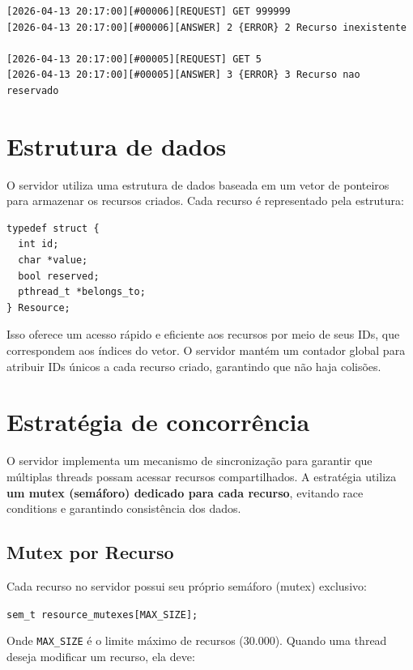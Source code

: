 \documentclass{article}
\begin{document}
\begin{Verbatim}[tabsize=4]
[2026-04-13 20:17:00][#00006][REQUEST] GET 999999
[2026-04-13 20:17:00][#00006][ANSWER] 2 {ERROR} 2 Recurso inexistente

[2026-04-13 20:17:00][#00005][REQUEST] GET 5
[2026-04-13 20:17:00][#00005][ANSWER] 3 {ERROR} 3 Recurso nao reservado

\end{Verbatim}

\section{Estrutura de dados}
O servidor utiliza uma estrutura de dados baseada em um vetor de ponteiros para armazenar os recursos criados. Cada recurso é representado pela estrutura:

\begin{verbatim}
typedef struct {
  int id;
  char *value;
  bool reserved;
  pthread_t *belongs_to;
} Resource;
\end{verbatim}

Isso oferece um acesso rápido e eficiente aos recursos por meio de seus IDs, que correspondem aos índices do vetor. O servidor mantém um contador global para atribuir IDs únicos a cada recurso criado, garantindo que não haja colisões.

\section{Estratégia de concorrência}

O servidor implementa um mecanismo de sincronização para garantir que múltiplas threads possam acessar recursos compartilhados. A estratégia utiliza \textbf{um mutex (semáforo) dedicado para cada recurso}, evitando race conditions e garantindo consistência dos dados.

\subsection{Mutex por Recurso}

Cada recurso no servidor possui seu próprio semáforo (mutex) exclusivo:

\begin{flushleft}
\texttt{sem\_t resource\_mutexes[MAX\_SIZE];}
\end{flushleft}

Onde \texttt{MAX\_SIZE} é o limite máximo de recursos (30.000). Quando uma thread deseja modificar um recurso, ela deve:
\end{document}
